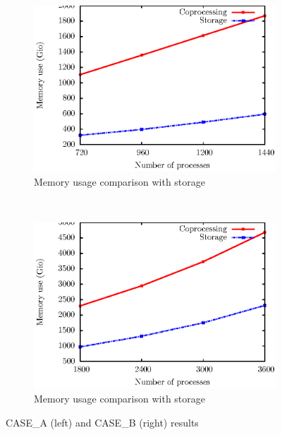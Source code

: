 \begin{figure}
        \begin{subfigure}[b]{0.50\textwidth}
                \includegraphics[scale=0.50]{pictures/test3.ps}
                \caption{Memory usage comparison with storage}
                \label{fig:mem}
        \end{subfigure}
        ~
        \begin{subfigure}[b]{0.50\textwidth}
                \includegraphics[scale=0.50]{pictures/test32.ps}
                \caption{Memory usage comparison with storage}
                \label{fig:204mem}
        \end{subfigure}
        \caption{CASE\_A (left) and CASE\_B (right) results}\label{fig:animals}
\end{figure}

